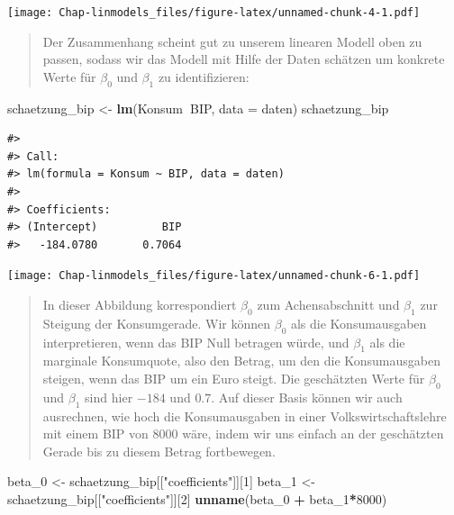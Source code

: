 \documentclass[]{book}
\newenvironment{Shaded}{\begin{snugshade}}{\end{snugshade}}
\newcommand{\KeywordTok}[1]{\textcolor[rgb]{0.13,0.29,0.53}{\textbf{#1}}}
\newcommand{\DataTypeTok}[1]{\textcolor[rgb]{0.13,0.29,0.53}{#1}}
\newcommand{\DecValTok}[1]{\textcolor[rgb]{0.00,0.00,0.81}{#1}}
\newcommand{\StringTok}[1]{\textcolor[rgb]{0.31,0.60,0.02}{#1}}
\newcommand{\OperatorTok}[1]{\textcolor[rgb]{0.81,0.36,0.00}{\textbf{#1}}}
\newcommand{\NormalTok}[1]{#1}
\begin{document}
\texttt{[image: Chap-linmodels\_files/figure-latex/unnamed-chunk-4-1.pdf]}

\begin{quote}
Der Zusammenhang scheint gut zu unserem linearen Modell oben zu passen,
sodass wir das Modell mit Hilfe der Daten schätzen um konkrete Werte für
\(\beta_0\) und \(\beta_1\) zu identifizieren:
\end{quote}

\begin{Shaded}
\begin{Highlighting}[]
\NormalTok{schaetzung_bip <-}\StringTok{ }\KeywordTok{lm}\NormalTok{(Konsum}\OperatorTok{~}\NormalTok{BIP, }\DataTypeTok{data =}\NormalTok{ daten)}
\NormalTok{schaetzung_bip}
\end{Highlighting}
\end{Shaded}

\begin{verbatim}
#> 
#> Call:
#> lm(formula = Konsum ~ BIP, data = daten)
#> 
#> Coefficients:
#> (Intercept)          BIP  
#>   -184.0780       0.7064
\end{verbatim}

\texttt{[image: Chap-linmodels\_files/figure-latex/unnamed-chunk-6-1.pdf]}

\begin{quote}
In dieser Abbildung korrespondiert \(\beta_0\) zum Achensabschnitt und
\(\beta_1\) zur Steigung der Konsumgerade. Wir können \(\beta_0\) als
die Konsumausgaben interpretieren, wenn das BIP Null betragen würde, und
\(\beta_1\) als die marginale Konsumquote, also den Betrag, um den die
Konsumausgaben steigen, wenn das BIP um ein Euro steigt. Die geschätzten
Werte für \(\beta_0\) und \(\beta_1\) sind hier \(-184\) und \(0.7\).
Auf dieser Basis können wir auch ausrechnen, wie hoch die Konsumausgaben
in einer Volkswirtschaftslehre mit einem BIP von 8000 wäre, indem wir
uns einfach an der geschätzten Gerade bis zu diesem Betrag fortbewegen.
\end{quote}

\begin{Shaded}
\begin{Highlighting}[]
\NormalTok{beta_}\DecValTok{0}\NormalTok{ <-}\StringTok{ }\NormalTok{schaetzung_bip[[}\StringTok{"coefficients"}\NormalTok{]][}\DecValTok{1}\NormalTok{]}
\NormalTok{beta_}\DecValTok{1}\NormalTok{ <-}\StringTok{ }\NormalTok{schaetzung_bip[[}\StringTok{"coefficients"}\NormalTok{]][}\DecValTok{2}\NormalTok{]}
\KeywordTok{unname}\NormalTok{(beta_}\DecValTok{0} \OperatorTok{+}\StringTok{ }\NormalTok{beta_}\DecValTok{1}\OperatorTok{*}\DecValTok{8000}\NormalTok{)}
\end{Highlighting}
\end{Shaded}
\end{document}
